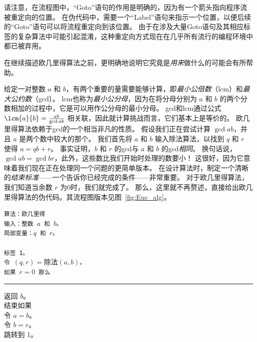 请注意，在流程图中，“Goto”语句的作用是明确的，因为有一个箭头指向程序流被重定向的位置。
在伪代码中，需要一个“Label”语句来指示一个位置，以便后续的“Goto”语句可以将流程重定向到该位置。
由于在涉及大量Goto语句及其相应标签的复杂算法中可能引起混淆，这种重定向方式现在在几乎所有流行的编程环境中都已被弃用。

在继续描述欧几里得算法之前，更明确地说明它究竟是{\em 用来}做什么的可能会有所帮助。

给定一对整数 $a$ 和 $b$，有两个重要的量需要能够计算，即\emph{最小公倍数}（lcm）和\emph{最大公约数}（gcd）。
lcm也称为{\em 最小公分母}，因为在将分母分别为 $a$ 和 $b$ 的两个分数相加的过程中，它是可以用作公分母的最小分母。
gcd和lcm通过公式 $\lcm{a}{b} = \frac{ab}{\gcd{a}{b}}$ 相关联，因此就计算挑战而言，它们基本上是等价的。
欧几里得算法依赖于gcd的一个相当非凡的性质。
假设我们正在尝试计算 $\gcd{a}{b}$，并且 $a$ 是两个数中较大的那个。
我们首先将 $a$ 和 $b$ 输入除法算法，以找到 $q$ 和 $r$ 使得 $a = qb +r$。
事实证明，$b$ 和 $r$ 的gcd与 $a$ 和 $b$ 的gcd{\em 相同}。
换句话说，$\gcd{a}{b} = \gcd{b}{r}$，此外，这些数比我们开始时处理的数要小！
这很好，因为它意味着我们现在正在处理同一个问题的更简单版本。
在设计算法时，制定一个清晰的{\em 结束标准}——一个告诉你已经完成的条件——非常重要。
对于欧几里得算法，我们知道当余数 $r$ 为0时，我们就完成了。
那么，这里就不再赘述，直接给出欧几里得算法的伪代码。其流程图版本见图~\ref{fig:Euc_alg}。

\medskip

\begin{center}
  \begin{minipage}[b]{.7\textwidth}
    \tt 算法：欧几里得\\
    输入：整数 $a$ 和 $b$。\\
    局部变量：$q$ 和 $r$。\\
    \\
    标签 1。\\
    令 $(q,r) = \mbox{除法}(a,b)$。\\
    如果 $r = 0$ 那么\\
    \rule{15pt}{0pt} 返回 $b$。\\
    结束如果\\
    令 $a = b$。\\
    令 $b = r$。\\
    跳转到 1。\\
  \end{minipage}
\end{center}

